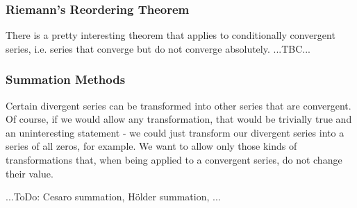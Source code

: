 \subsubsection{Riemann's Reordering Theorem} There is a pretty interesting theorem that applies to conditionally convergent series, i.e. series that converge but do not converge absolutely. ...TBC...


\subsubsection{Summation Methods} Certain divergent series can be transformed into other series that are convergent. Of course, if we would allow any transformation, that would be trivially true and an uninteresting statement - we could just transform our divergent series into a series of all zeros, for example. We want to allow only those kinds of transformations that, when being applied to a convergent series, do not change their value. 




...ToDo: Cesaro summation, Hölder summation, ...


